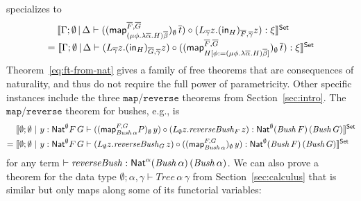 \documentclass[runningheads]{llncs}
\newcommand{\map}{\mathsf{map}}
\begin{document}
specializes to
\begin{equation}\label{thm:subst}
\begin{array}{l}
\hspace*{0.135in}\setsem{\Gamma; \emptyset \,|\, \Delta \vdash
((\map_{(\mu \phi. \lambda
    \overline{\alpha}. H) \overline{\beta}}^{\overline{F},
    \overline{G}})_\emptyset\, \overline{t}) \circ (L_{\overline{\gamma}} z.
  (\tin_{H})_{\overline{F},
    \overline{\gamma}} z) : \xi}\\
= \setsem{\Gamma; \emptyset \,|\, \Delta
\vdash (L_{\overline{\gamma}} z. (\tin_H)_{\overline{G},
  \overline{\gamma}} z) \circ
  ((\map_{H[\phi := (\mu \phi. \lambda \overline{\alpha}. H)
      \overline{\beta}]}^{\overline{F},
    \overline{G}})_\emptyset\, \overline{t})
  : \xi}
\end{array}
\end{equation}
\noindent
Theorem~\ref{eq:ft-from-nat} gives a family of free theorems that are
consequences of naturality, and thus do not require the full power of
parametricity. Other specific instances include the three
$\mathtt{map}$/$\mathtt{reverse}$ theorems from
Section~\ref{sec:intro}. The $\mathtt{map}$/$\mathtt{reverse}$ theorem
for bushes, e.g., is
\begin{align*}
  &\setsem{\emptyset; \emptyset~|~ y : \Nat^\emptyset F \, G
    \vdash ((\map_{\mathit{Bush}\,\alpha}^{{F},
      {G}}P)_\emptyset\, y) \circ (L_{{\emptyset}}
    z. \mathit{reverseBush}_{F}\, z) : \Nat^{{\emptyset}}
    (\mathit{Bush} \, F) \, (\mathit{Bush} \, G) }\\ =\;
  &\setsem{\emptyset; \emptyset~|~ y : \Nat^\emptyset F\, G
    \vdash (L_{\emptyset} z. \mathit{reverseBush}_{G}\,z) \circ
    ((\map_{\mathit{Bush} \, \alpha}^{F, G})_\emptyset\,
           {y}) : \Nat^{\emptyset} (\mathit{Bush} \, F ) \,
           (\mathit{Bush} \, G)}
\end{align*}
for any term $\vdash \mathit{reverseBush} : \mathsf{Nat}^\alpha (\mathit{Bush}
\,\alpha) \, (\mathit{Bush} \, \alpha)$. We can also prove a theorem
for the data type $\emptyset;\alpha,\gamma \vdash
\mathit{Tree}\,\alpha\,\gamma$ from Section~\ref{sec:calculus} that is
similar but only maps along some of its functorial variables:
\end{document}

